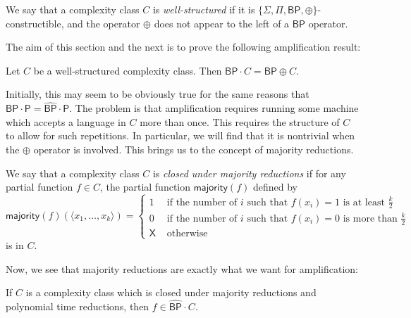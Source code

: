 \documentclass[11pt]{article}
\newcommand{\bp}{\textsf{BP}}
\newcommand{\strongbp}{\widehat{\textsf{BP}}}
\newcommand{\parity}{\oplus}
\newcommand{\p}{\textsf{P}}
\newcommand{\x}{\textsf{X}}
\newcommand{\majority}{\textsf{majority}}
\begin{document}
\begin{definition}
We say that a complexity class $C$ is \emph{well-structured} if it is $\{\Sigma, \Pi, \bp, \parity\}$-constructible, and the operator $\parity$ does not appear to the left of a $\bp$ operator.
\end{definition}

The aim of this section and the next is to prove the following amplification result:

\begin{theorem}\label{amplify}
Let $C$ be a well-structured complexity class. Then \emph{$\bp \cdot C = \bp \parity C$}.
\end{theorem}

Initially, this may seem to be obviously true for the same reasons that $\bp \cdot \p = \strongbp \cdot \p$. The problem is that amplification requires running some machine which accepts a language in $C$ more than once. This requires the structure of $C$ to allow for such repetitions. In particular, we will find that it is nontrivial when the $\parity$ operator is involved. This brings us to the concept of majority reductions.
\begin{definition}\label{defmajority}
We say that a complexity class $C$ is \emph{closed under majority reductions} if for any partial function $f \in C$, the partial function $\majority(f)$ defined by
$$\majority(f)(\langle x_1, \ldots, x_k\rangle) = 
\begin{cases}1 & \text{ if the number of $i$ such that }f(x_i) = 1\text{ is at least $\frac{k}{2}$} \\
0 & \text{ if the number of $i$ such that }f(x_i) = 0\text{ is more than $\frac{k}{2}$}\\
\x & \text{ otherwise}
\end{cases}$$
is in $C$.
\end{definition}
Now, we see that majority reductions are exactly what we want for amplification:
\begin{lemma}\label{majorityimpliesamplify}
If $C$ is a complexity class which is closed under majority reductions and polynomial time reductions, then \emph{$f\in\strongbp \cdot C$.}
\end{lemma}
\end{document}
